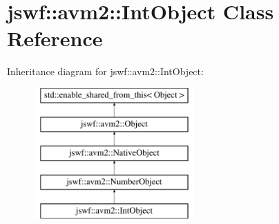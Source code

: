 \hypertarget{classjswf_1_1avm2_1_1_int_object}{\section{jswf\+:\+:avm2\+:\+:Int\+Object Class Reference}
\label{classjswf_1_1avm2_1_1_int_object}
}
Inheritance diagram for jswf\+:\+:avm2\+:\+:Int\+Object\+:\begin{figure}[H]
\begin{center}
\leavevmode
\includegraphics[height=5.000000cm]{classjswf_1_1avm2_1_1_int_object}
\end{center}
\end{figure}
